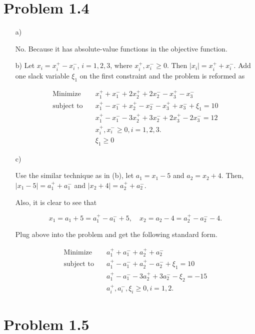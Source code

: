 \documentclass[12pt]{article}
\begin{document}
\section*{Problem 1.4}
\begin{enumerate}
\item[a)]

No. Because it has absolute-value functions in the objective function.

\item[b)]
Let $x_i = x_i^+ - x_i^-$, $i = 1, 2, 3$, where $x_i^+, x_i^- \geqslant 0$. Then $|x_i| = x_i^+ + x_i^-$. Add one slack variable $\xi_1$ on the first constraint and the problem is reformed as

\begin{equation*}
\begin{aligned}
\text{Minimize} \quad & x_1^+ + x_1^- + 2x_2^+ + 2x_2^- - x_3^+ - x_3^- \\
\text{subject\  to} \quad & x_1^+ - x_1^- + x_2^+ - x_2^- - x_3^+ + x_3^- + \xi_1 = 10 \\
& x_1^+ - x_1^- - 3x_2^+ + 3x_2^- + 2x_3^+ - 2x_3^- = 12 \\
& x_i^+, x_i^- \geqslant 0, i = 1, 2, 3. \\
& \xi_1 \geqslant 0
\end{aligned}
\end{equation*}

\item[c)]

Use the similar technique as in (b), let $a_1 = x_1 - 5$ and $a_2 = x_2 + 4$. Then, $|x_1 - 5| = a_1^+ + a_1^-$ and $ |x_2 + 4| = a_2^+ + a_2^-$. 

Also, it is clear to see that

$$
x_1 = a_1 + 5 = a_1^+ - a_1^- + 5, \quad x_2 = a_2 - 4 = a_2^+ - a_2^- - 4.
$$

Plug above into the problem and get the following standard form.

\begin{equation*}
\begin{aligned}
\text{Minimize} \quad & a_1^+ + a_1^- + a_2^+ + a_2^- \\
\text{subject\  to} \quad & a_1^+ - a_1^- + a_2^+ - a_2^- + \xi_1 = 10 \\
& a_1^+ - a_1^- - 3a_2^+ + 3a_2^- - \xi_2 = -15 \\
& a_i^+, a_i^-, \xi_i \geqslant 0, i = 1, 2. 
\end{aligned}
\end{equation*}
\end{enumerate}


\section*{Problem 1.5}
\end{document}
